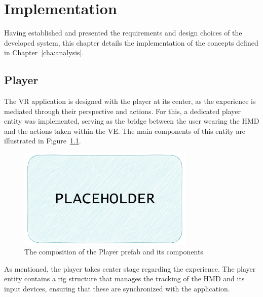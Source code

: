 
%

\chapter{Implementation}
\label{cha:implementation}

Having established and presented the requirements and design choices of the developed system, this chapter details the implementation of the concepts 
defined in Chapter~\ref{cha:analysis}. 


\section{Player}
\label{sec:player}

The \gls{VR} application is designed with the player at its center, as the experience is mediated through their perspective and actions. For this, a dedicated player entity was implemented, serving as the bridge between the user wearing the \gls{HMD} and the actions taken within the \gls{VE}. The main components of this entity are illustrated in Figure~\ref{fig:player}.

\begin{figure}[b]
    \centering
     \includegraphics[width=0.75\textwidth]{NOVAthesisFiles/Images/placeholder.pdf}
     \caption[Hierarchy of Player prefab]
     {The composition of the Player prefab and its components}
     \label{fig:player}
\end{figure}

As mentioned, the player takes center stage regarding the experience. The player entity contains a rig structure that manages the tracking of 
the \gls{HMD} and its input devices, ensuring that these are synchronized with the application.

